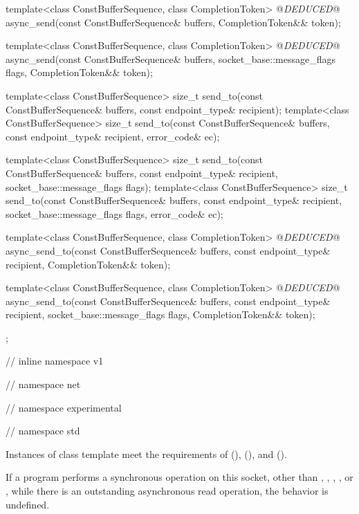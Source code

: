 \begin{codeblock}
{{{{{    template<class ConstBufferSequence, class CompletionToken>
      @\textit{DEDUCED}@ async_send(const ConstBufferSequence& buffers,
                         CompletionToken&& token);

    template<class ConstBufferSequence, class CompletionToken>
      @\textit{DEDUCED}@ async_send(const ConstBufferSequence& buffers,
                         socket_base::message_flags flags,
                         CompletionToken&& token);

    template<class ConstBufferSequence>
      size_t send_to(const ConstBufferSequence& buffers,
                     const endpoint_type& recipient);
    template<class ConstBufferSequence>
      size_t send_to(const ConstBufferSequence& buffers,
                     const endpoint_type& recipient, error_code& ec);

    template<class ConstBufferSequence>
      size_t send_to(const ConstBufferSequence& buffers,
                     const endpoint_type& recipient,
                     socket_base::message_flags flags);
    template<class ConstBufferSequence>
      size_t send_to(const ConstBufferSequence& buffers,
                     const endpoint_type& recipient,
                     socket_base::message_flags flags, error_code& ec);

    template<class ConstBufferSequence, class CompletionToken>
      @\textit{DEDUCED}@ async_send_to(const ConstBufferSequence& buffers,
                            const endpoint_type& recipient,
                            CompletionToken&& token);

    template<class ConstBufferSequence, class CompletionToken>
      @\textit{DEDUCED}@ async_send_to(const ConstBufferSequence& buffers,
                            const endpoint_type& recipient,
                            socket_base::message_flags flags,
                            CompletionToken&& token);
  };

} // inline namespace v1
} // namespace net
} // namespace experimental
} // namespace std
\end{codeblock}

\pnum
Instances of class template  meet the requirements of  (),  (), and  ().

\pnum
If a program performs a synchronous operation on this socket, other than , , , , or , while there is an outstanding asynchronous read operation, the behavior is undefined.

